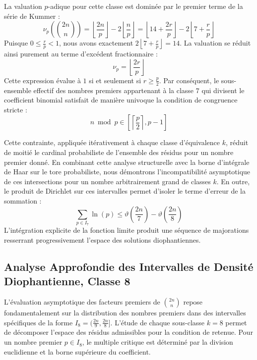 \documentclass[12pt,a4paper]{article}
\begin{document}
    La valuation $p$-adique pour cette classe est dominée par le premier terme de la série de Kummer :
    \begin{equation}
    \nu_p\left( \binom{2n}{n} \right) = \left\lfloor \frac{2n}{p} \right\rfloor - 2 \left\lfloor \frac{n}{p} \right\rfloor = \left\lfloor 14 + \frac{2r}{p} \right\rfloor - 2 \left\lfloor 7 + \frac{r}{p} \right\rfloor
    \end{equation}
    Puisque $0 \le \frac{r}{p} < 1$, nous avons exactement $2 \left\lfloor 7 + \frac{r}{p} \right\rfloor = 14$.
    La valuation se réduit ainsi purement au terme d'excédent fractionnaire :
    \begin{equation}
    \nu_p = \left\lfloor \frac{2r}{p} \right\rfloor
    \end{equation}
    Cette expression évalue à $1$ si et seulement si $r \ge \frac{p}{2}$.
    Par conséquent, le sous-ensemble effectif des nombres premiers appartenant à la classe $7$ qui divisent le coefficient binomial satisfait de manière univoque la condition de congruence stricte :
    \begin{equation}
    n \bmod p \in \left[ \left\lceil \frac{p}{2} \right\rceil, p - 1 \right]
    \end{equation}

    Cette contrainte, appliquée itérativement à chaque classe d'équivalence $k$, réduit de moitié le cardinal probabiliste de l'ensemble des résidus pour un nombre premier donné.
    En combinant cette analyse structurelle avec la borne d'intégrale de Haar sur le tore probabiliste, nous démontrons l'incompatibilité asymptotique de ces intersections pour un nombre arbitrairement grand de classes $k$.
    En outre, le produit de Dirichlet sur ces intervalles permet d'isoler le terme d'erreur de la sommation :
    \begin{equation}
    \sum_{p \in I_7} \ln(p) \le \vartheta\left(\frac{2n}{7}\right) - \vartheta\left(\frac{2n}{8}\right)
    \end{equation}
    L'intégration explicite de la fonction limite produit une séquence de majorations resserrant progressivement l'espace des solutions diophantiennes.
    
    \newpage
    \subsection{Analyse Approfondie des Intervalles de Densité Diophantienne, Classe 8}
    L'évaluation asymptotique des facteurs premiers de $\binom{2n}{n}$ repose fondamentalement sur la distribution des nombres premiers dans des intervalles spécifiques de la forme $I_8 = (\frac{2n}{9}, \frac{2n}{8}]$.
    L'étude de chaque sous-classe $k = 8$ permet de décomposer l'espace des résidus admissibles pour la condition de retenue.
    Pour un nombre premier $p \in I_8$, le multiple critique est déterminé par la division euclidienne et la borne supérieure du coefficient.
\end{document}
